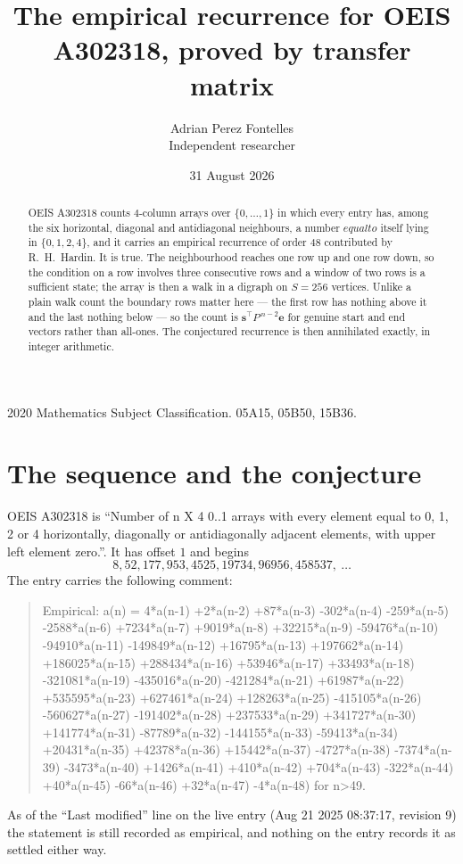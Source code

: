 \documentclass[11pt,a4paper]{article}
\title{The empirical recurrence for OEIS A302318, proved by transfer matrix}
\author{Adrian Perez Fontelles\\ \small Independent researcher}
\date{31 August 2026}
\theoremstyle{plain}
\theoremstyle{definition}
\begin{document}
\maketitle

\begin{abstract}
OEIS A302318 counts $4$-column arrays over $\{0,\dots,1\}$ in which every entry has,
among the six horizontal, diagonal and antidiagonal neighbours, a number $equal to$ itself lying in $\{0,1,2,4\}$, and it carries an empirical
recurrence of order $48$ contributed by R.~H.~Hardin. It is true. The neighbourhood
reaches one row up and one row down, so the condition on a row involves three consecutive
rows and a window of two rows is a sufficient state; the array is then a walk in a digraph
on $S=256$ vertices. Unlike a plain walk count the boundary rows matter here --- the first
row has nothing above it and the last nothing below --- so the count is
$\mathbf{s}^{\!\top}P^{\,n-2}\mathbf{e}$ for genuine start and end vectors rather than
all-ones. The conjectured recurrence is then annihilated exactly, in integer arithmetic.
\end{abstract}

\noindent\small 2020 Mathematics Subject Classification. 05A15, 05B50, 15B36.\normalsize

\section{The sequence and the conjecture}

OEIS A302318 is ``Number of n X 4 0..1 arrays with every element equal to 0, 1, 2 or 4 horizontally, diagonally or antidiagonally adjacent elements, with upper left element zero.''. It has offset
$1$ and begins
\[
8, 52, 177, 953, 4525, 19734, 96956, 458537,\ \dots
\]
The entry carries the following comment:
\begin{quote}\small
Empirical: a(n) = 4*a(n-1) +2*a(n-2) +87*a(n-3) -302*a(n-4) -259*a(n-5) -2588*a(n-6) +7234*a(n-7) +9019*a(n-8) +32215*a(n-9) -59476*a(n-10) -94910*a(n-11) -149849*a(n-12) +16795*a(n-13) +197662*a(n-14) +186025*a(n-15) +288434*a(n-16) +53946*a(n-17) +33493*a(n-18) -321081*a(n-19) -435016*a(n-20) -421284*a(n-21) +61987*a(n-22) +535595*a(n-23) +627461*a(n-24) +128263*a(n-25) -415105*a(n-26) -560627*a(n-27) -191402*a(n-28) +237533*a(n-29) +341727*a(n-30) +141774*a(n-31) -87789*a(n-32) -144155*a(n-33) -59413*a(n-34) +20431*a(n-35) +42378*a(n-36) +15442*a(n-37) -4727*a(n-38) -7374*a(n-39) -3473*a(n-40) +1426*a(n-41) +410*a(n-42) +704*a(n-43) -322*a(n-44) +40*a(n-45) -66*a(n-46) +32*a(n-47) -4*a(n-48) for n>49.
\end{quote}
As of the ``Last modified'' line on the live entry (Aug 21 2025 08:37:17, revision
9) the statement is still recorded as empirical, and nothing on the entry
records it as settled either way.
\end{document}
